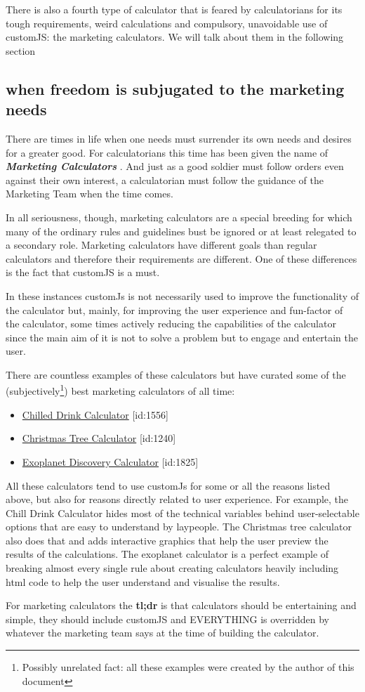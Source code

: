 There is also a fourth type of calculator that is feared by calculatorians for its tough requirements, weird calculations and compulsory, unavoidable use of customJS: the marketing calculators. We will talk about them in the following section

\subsection{when freedom is subjugated to the marketing needs}
\label{sub:marketing}
There are times in life when one needs must surrender its own needs and desires for a greater good. For calculatorians this time has been given the name of \textbf{\textit{Marketing Calculators}} . And just as a good soldier must follow orders even against their own interest, a calculatorian must follow the guidance of the Marketing Team when the time comes. 

In all seriousness, though, marketing calculators are a special breeding for which many of the ordinary rules and guidelines bust be ignored or at least relegated to a secondary role. Marketing calculators have different goals than regular calculators and therefore their requirements are different. One of these differences is the fact that customJS is a must. 

In these instances customJs is not necessarily used to improve the functionality of the calculator but, mainly, for improving the user experience and fun-factor of the calculator, some times actively reducing the capabilities of the calculator since the main aim of it is not to solve a problem but to engage and entertain the user. 

There are countless examples of these calculators but have curated some of the (subjectively\footnote{Possibly unrelated fact: all these examples were created by the author of this document}) best marketing calculators of all time:
\begin{itemize}
    \item \href{https://www.omnicalculator.com/all/chilled-drink}{Chilled Drink Calculator} [id:1556]
    \item \href{https://www.omnicalculator.com/all/christmas-tree}{Christmas Tree Calculator} [id:1240]
    \item \href{https://www.omnicalculator.com/all/exoplanet}{Exoplanet Discovery Calculator} [id:1825]
\end{itemize}

All these calculators tend to use customJs for some or all the reasons listed above, but also for reasons directly related to user experience. For example, the Chill Drink Calculator hides most of the technical variables behind user-selectable options that are easy to understand by laypeople. The Christmas tree calculator also does that and adds interactive graphics that help the user preview the results of the calculations. The exoplanet calculator is a perfect example of breaking almost every single rule about creating calculators heavily including html code to help the user understand and visualise the results.

    For marketing calculators the \textbf{tl;dr} is that calculators should be entertaining and simple, they should include customJS and EVERYTHING is overridden by whatever the marketing team says at the time of building the calculator.
